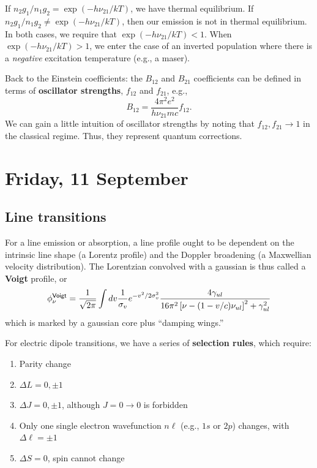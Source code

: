 \documentclass{tufte-handout}
\renewcommand{\textbf}[1]{{\bf \textcolor{dark-gray}{#1}}}
\renewcommand{\rm}{\sf}
\begin{document}
If $n_2 g_1/ n_1 g_2 = \exp(- h \nu_{21} / kT)$, we have thermal equilibrium. If $n_2 g_1 / n_1 g_2 \neq \exp (-h\nu_{21}/kT)$, then our emission is not in thermal equilibrium. In both cases, we require that $\exp(-h \nu_{21}/kT) < 1$. When $\exp(-h \nu_{21}/kT) > 1$, we enter the case of an inverted population where there is a \textit{negative} excitation temperature (e.g., a maser).

Back to the Einstein coefficients: the $B_{12}$ and $B_{21}$ coefficients can be defined in terms of \textbf{oscillator strengths}, $f_{12}$ and $f_{21}$, e.g.,
\begin{equation}
B_{12} = \frac{4\pi^2 e^2}{h\nu_{21} mc} f_{12}.
\end{equation}
We can gain a little intuition of oscillator strengths by noting that $f_{12}, f_{21} \rightarrow 1$ in the classical regime. Thus, they represent quantum corrections.

\section{Friday, 11 September}

\subsection{Line transitions}
For a line emission or absorption, a line profile ought to be dependent on the intrinsic line shape (a Lorentz profile) and the Doppler broadening (a Maxwellian velocity distribution). The Lorentzian convolved with a gaussian is thus called a \textbf{Voigt} profile, or
\begin{equation}
\phi_\nu^{\rm Voigt} = \frac{1}{\sqrt{2\pi}} \int dv \frac{1}{\sigma_v} e^{-v^2 / 2\sigma_v^2} \frac{4 \gamma_{ul}}{16 \pi^2 \left [\nu - (1-v/c)\nu_{ul}\right ]^2 + \gamma_{ul}^2}
\end{equation}
which is marked by a gaussian core plus ``damping wings.''

For electric dipole transitions, we have a series of \textbf{selection rules}, which require:
\begin{enumerate}
\item Parity change
\item $\Delta L = 0, \pm 1$
\item $\Delta J=0, \pm 1$, although $J=0 \rightarrow 0$ is forbidden
\item Only one single electron wavefunction $n\ell$ (e.g., $1s$ or $2p$) changes, with $\Delta \ell = \pm 1$
\item $\Delta S = 0$, spin cannot change
\end{enumerate}
\end{document}
